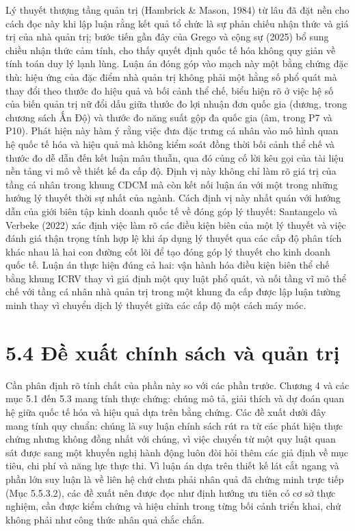 \documentclass[
  a4paper,
  13pt]{extreport}
\begin{document}
Lý thuyết thượng tầng quản trị (Hambrick \& Mason, 1984) từ lâu đã đặt
nền cho cách đọc này khi lập luận rằng kết quả tổ chức là sự phản chiếu
nhận thức và giá trị của nhà quản trị; bước tiến gần đây của Grego và
cộng sự (2025) bổ sung chiều nhận thức cảm tính, cho thấy quyết định
quốc tế hóa không quy giản về tính toán duy lý lạnh lùng. Luận án đóng
góp vào mạch này một bằng chứng đặc thù: hiệu ứng của đặc điểm nhà quản
trị không phải một hằng số phổ quát mà thay đổi theo thước đo hiệu quả
và bối cảnh thể chế, biểu hiện rõ ở việc hệ số của biến quản trị nữ đổi
dấu giữa thước đo lợi nhuận đơn quốc gia (dương, trong chương sách Ấn
Độ) và thước đo năng suất gộp đa quốc gia (âm, trong P7 và P10). Phát
hiện này hàm ý rằng việc đưa đặc trưng cá nhân vào mô hình quan hệ quốc
tế hóa và hiệu quả mà không kiểm soát đồng thời bối cảnh thể chế và
thước đo dễ dẫn đến kết luận mâu thuẫn, qua đó củng cố lời kêu gọi của
tài liệu nền tảng vi mô về thiết kế đa cấp độ. Định vị này không chỉ làm
rõ giá trị của tầng cá nhân trong khung CDCM mà còn kết nối luận án với
một trong những hướng lý thuyết thời sự nhất của ngành. Cách định vị này
nhất quán với hướng dẫn của giới biên tập kinh doanh quốc tế về đóng góp
lý thuyết: Santangelo và Verbeke (2022) xác định việc làm rõ các điều
kiện biên của một lý thuyết và việc đánh giá thận trọng tính hợp lệ khi
áp dụng lý thuyết qua các cấp độ phân tích khác nhau là hai con đường
cốt lõi để tạo đóng góp lý thuyết cho kinh doanh quốc tế. Luận án thực
hiện đúng cả hai: vận hành hóa điều kiện biên thể chế bằng khung ICRV
thay vì giả định một quy luật phổ quát, và nối tầng vĩ mô thể chế với
tầng cá nhân nhà quản trị trong một khung đa cấp được lập luận tường
minh thay vì chuyển dịch lý thuyết giữa các cấp độ một cách máy móc.

\hypertarget{ux111ux1ec1-xuux1ea5t-chuxednh-suxe1ch-vuxe0-quux1ea3n-trux1ecb}{%
\section{5.4 Đề xuất chính sách và quản
trị}\label{ux111ux1ec1-xuux1ea5t-chuxednh-suxe1ch-vuxe0-quux1ea3n-trux1ecb}}

Cần phân định rõ tính chất của phần này so với các phần trước. Chương 4
và các mục 5.1 đến 5.3 mang tính thực chứng: chúng mô tả, giải thích và
dự đoán quan hệ giữa quốc tế hóa và hiệu quả dựa trên bằng chứng. Các đề
xuất dưới đây mang tính quy chuẩn: chúng là suy luận chính sách rút ra
từ các phát hiện thực chứng nhưng không đồng nhất với chúng, vì việc
chuyển từ một quy luật quan sát được sang một khuyến nghị hành động luôn
đòi hỏi thêm các giả định về mục tiêu, chi phí và năng lực thực thi. Vì
luận án dựa trên thiết kế lát cắt ngang và phần lớn suy luận là về liên
hệ chứ chưa phải nhân quả đã chứng minh trực tiếp (Mục 5.5.3.2), các đề
xuất nên được đọc như định hướng ưu tiên có cơ sở thực nghiệm, cần được
kiểm chứng và hiệu chỉnh trong từng bối cảnh triển khai, chứ không phải
như công thức nhân quả chắc chắn.
\end{document}
